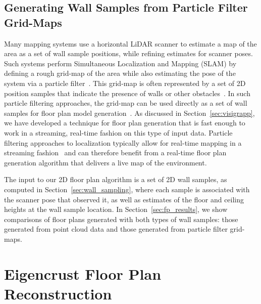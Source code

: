 \documentclass[12pt,onecolumn,oneside]{book}
\begin{document}
\subsection{Generating Wall Samples from Particle Filter Grid-Maps}
\label{ssec:ws_from_pf}

Many mapping systems use a horizontal LiDAR scanner to estimate a map of the area as a set of wall sample positions, while refining estimates for scanner poses.  Such systems perform Simultaneous Localization and Mapping (SLAM) by defining a rough grid-map of the area while also estimating the pose of the system via a particle filter~\cite{NickJournal,Quadrotor}.  This grid-map is often represented by a set of 2D position samples that indicate the presence of walls or other obstacles~\cite{ProbabilisticRobotics}.  In such particle filtering approaches, the grid-map can be used directly as a set of wall samples for floor plan model generation~\cite{Turner14}.  As discussed in Section~\ref{sec:visigrapp}, we have developed a technique for floor plan generation that is fast enough to work in a streaming, real-time fashion on this type of input data.  Particle filtering approaches to localization typically allow for real-time mapping in a streaming fashion~\cite{fastslam03,toro07} and can therefore benefit from a real-time floor plan generation algorithm that delivers a live map of the environment. 

The input to our 2D floor plan algorithm is a set of 2D wall samples, as computed in Section~\ref{sec:wall_sampling}, where each sample is associated with the scanner pose that observed it, as well as estimates of the floor and ceiling heights at the wall sample location.  In Section~\ref{sec:fp_results}, we show comparisons of floor plans generated with both types of wall samples:  those generated from point cloud data and those generated from particle filter grid-maps.

\section{Eigencrust Floor Plan Reconstruction}
\label{sec:eigencrust}
\end{document}
